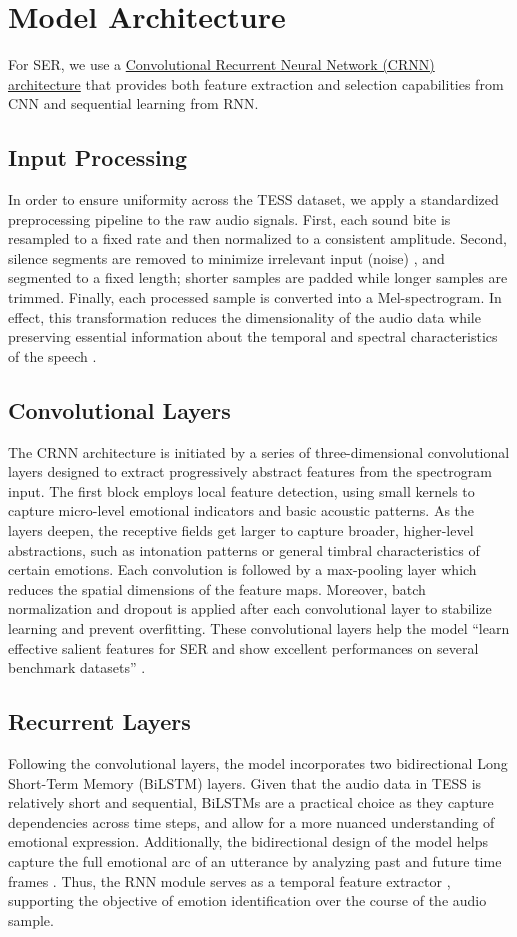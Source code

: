 \documentclass[../main.tex]{subfiles}
\begin{document}
\section{Model Architecture}
For SER, we use a \hyperref[fig:architecture]{Convolutional Recurrent Neural Network (CRNN) architecture}
that provides both feature extraction and selection capabilities 
from CNN and sequential learning from RNN. 

\subsection{Input Processing}
In order to ensure uniformity across the TESS dataset, we apply a standardized
preprocessing pipeline to the raw audio signals. First, each sound bite is
resampled to a fixed rate and then normalized to a consistent amplitude. Second,
silence segments are removed to minimize irrelevant input (noise) \citep{Orhan2021}, and segmented
to a fixed length; shorter samples are padded while longer samples are trimmed.
Finally, each processed sample is converted into a Mel-spectrogram. In effect,
this transformation reduces the dimensionality of the audio data while
preserving essential information about the temporal and spectral characteristics
of the speech \citep{Orhan2021}.

\subsection{Convolutional Layers}
The CRNN architecture is initiated by a series of three-dimensional convolutional
layers designed to extract progressively abstract features from the spectrogram
input. The first block employs local feature detection, using small kernels to
capture micro-level emotional indicators and basic acoustic patterns. As the
layers deepen, the receptive fields get larger to capture broader, higher-level
abstractions, such as intonation patterns or general timbral characteristics of
certain emotions. Each convolution is followed by a max-pooling layer which
reduces the spatial dimensions of the feature maps. Moreover, batch
normalization and dropout is applied after each convolutional layer to stabilize
learning and prevent overfitting. These convolutional layers help the model ``learn effective salient features for SER and show excellent performances on several benchmark datasets'' \citep{Chen2018}.

\subsection{Recurrent Layers}
Following the convolutional layers, the model incorporates two bidirectional
Long Short-Term Memory (BiLSTM) layers. Given that the audio data in TESS is
relatively short and sequential, BiLSTMs are a practical choice as they capture
dependencies across time steps, and allow for a more nuanced understanding of
emotional expression. Additionally, the bidirectional design of the model helps
capture the full emotional arc of an utterance by analyzing past and future time
frames \citep{Orhan2021}. Thus, the RNN module serves as a temporal feature extractor \citep{Chen2018}, supporting
the objective of emotion identification over the course of the audio sample.
\end{document}
